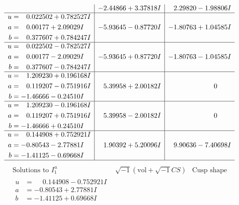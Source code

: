 \documentclass[1p]{elsarticle_modified}
\theoremstyle{definition}
\newcommand{\I}{\sqrt{-1}}
\begin{document}
$$\begin{array}{c|c|c}
 & -2.44866 + 3.37818 I & \phantom{-}2.29820 - 1.98806 I \\ \hline\begin{aligned}
u &= \phantom{-}0.022502 + 0.782527 I \\
a &= \phantom{-}0.00177 + 2.09029 I \\
b &= \phantom{-}0.377607 + 0.784247 I\end{aligned}
 & -5.93645 - 0.87720 I & -1.80763 + 1.04585 I \\ \hline\begin{aligned}
u &= \phantom{-}0.022502 - 0.782527 I \\
a &= \phantom{-}0.00177 - 2.09029 I \\
b &= \phantom{-}0.377607 - 0.784247 I\end{aligned}
 & -5.93645 + 0.87720 I & -1.80763 - 1.04585 I \\ \hline\begin{aligned}
u &= \phantom{-}1.209230 + 0.196168 I \\
a &= \phantom{-}0.119207 - 0.751916 I \\
b &= -1.46666 - 0.24510 I\end{aligned}
 & \phantom{-}5.39958 + 2.00182 I & \phantom{-0.000000 } 0 \\ \hline\begin{aligned}
u &= \phantom{-}1.209230 - 0.196168 I \\
a &= \phantom{-}0.119207 + 0.751916 I \\
b &= -1.46666 + 0.24510 I\end{aligned}
 & \phantom{-}5.39958 - 2.00182 I & \phantom{-0.000000 } 0 \\ \hline\begin{aligned}
u &= \phantom{-}0.144908 + 0.752921 I \\
a &= -0.80543 - 2.77881 I \\
b &= -1.41125 - 0.69668 I\end{aligned}
 & \phantom{-}1.90392 + 5.20096 I & \phantom{-}9.90636 - 7.40698 I\\
 \hline 
 \end{array}$$\newpage$$\begin{array}{c|c|c}  
\text{Solutions to }I^u_{1}& \I (\text{vol} + \sqrt{-1}CS) & \text{Cusp shape}\\
 \hline 
\begin{aligned}
u &= \phantom{-}0.144908 - 0.752921 I \\
a &= -0.80543 + 2.77881 I \\
b &= -1.41125 + 0.69668 I\end{aligned}

\end{array}$$
\end{document}
